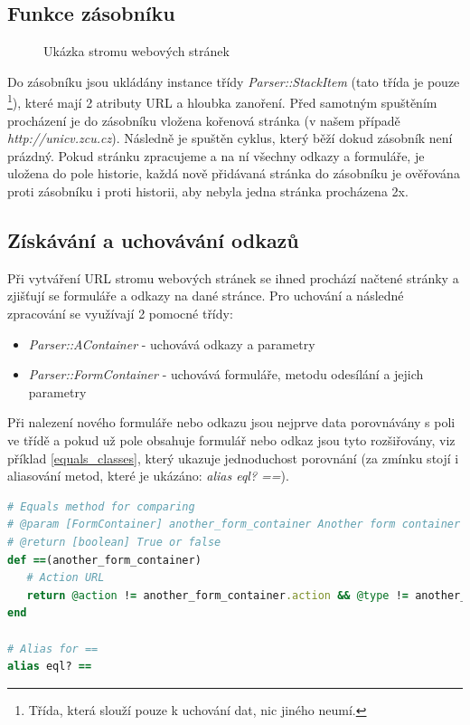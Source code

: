 \documentclass[12pt, a4paper]{report}
\begin{document}
\subsection{Funkce zásobníku}
\begin{figure}[h!]
\caption{Ukázka stromu webových stránek}
\label{obr.url_tree}
\end{figure}
Do zásobníku jsou ukládány instance třídy \textit{Parser::StackItem} (tato třída je pouze \footnote{Třída, která slouží pouze k uchování dat, nic jiného neumí.}), které mají 2 atributy URL a hloubka zanoření. Před samotným spuštěním procházení je do zásobníku vložena kořenová stránka (v našem případě \textit{http://unicv.zcu.cz}). Následně je spuštěn cyklus, který běží dokud zásobník není prázdný. Pokud stránku zpracujeme a na ní všechny odkazy a formuláře, je uložena do pole historie, každá nově přidávaná stránka do zásobníku je ověřována proti zásobníku i proti historii, aby nebyla jedna stránka procházena 2x.

\subsection{Získávání a uchovávání odkazů}
Při vytváření URL stromu webových stránek se ihned prochází načtené stránky a zjišťují se formuláře a odkazy na dané stránce. Pro uchování a následné zpracování se využívají 2 pomocné třídy:
\begin{itemize}
\item \textit{Parser::AContainer} - uchovává odkazy a parametry
\item \textit{Parser::FormContainer} - uchovává formuláře, metodu odesílání a jejich parametry
\end{itemize}
Při nalezení nového formuláře nebo odkazu jsou nejprve data porovnávány s poli ve třídě a pokud už pole obsahuje formulář nebo odkaz jsou tyto rozšiřovány, viz příklad \ref{equals_classes}, který ukazuje jednoduchost porovnání (za zmínku stojí i aliasování metod, které je ukázáno: \textit{alias eql? ==}).

\begin{lstlisting}[label=equals_classes,language=Ruby, caption=Porovnání dvou instancí třídy FormContainer]
# Equals method for comparing
# @param [FormContainer] another_form_container Another form container
# @return [boolean] True or false
def ==(another_form_container)
   # Action URL
   return @action != another_form_container.action && @type != another_form_container.type &&  @params != another_form_container.params
end

# Alias for ==
alias eql? ==
\end{lstlisting}
\end{document}
